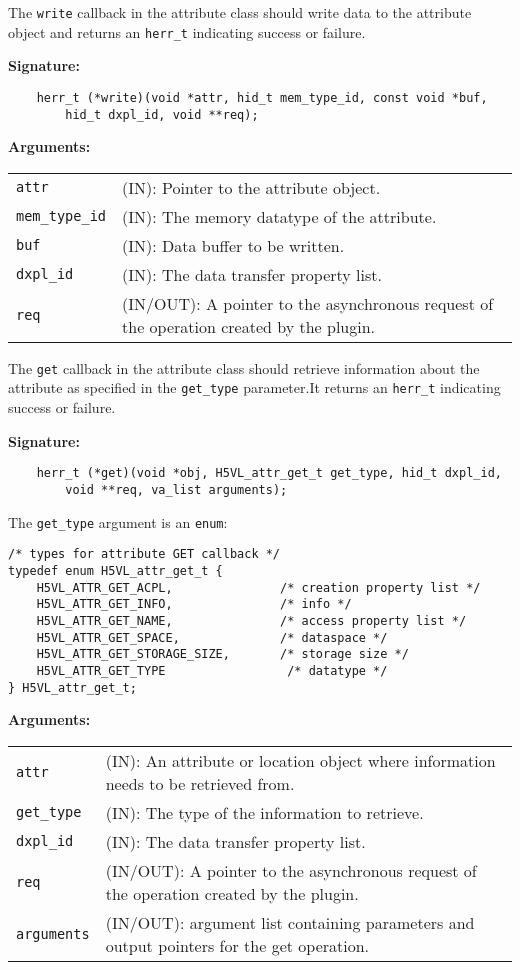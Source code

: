 The {\tt write} callback in the attribute class should write data to
the attribute object and returns an {\tt herr\_t} indicating success or
failure.

\textbf{Signature:}
\begin{lstlisting}
    herr_t (*write)(void *attr, hid_t mem_type_id, const void *buf, 
        hid_t dxpl_id, void **req);
\end{lstlisting}

\textbf{Arguments:}\\
\begin{tabular}{l p{10cm}}
  {\tt attr} & (IN): Pointer to the attribute object.\\
  {\tt mem\_type\_id} & (IN): The memory datatype of the attribute.\\
  {\tt buf} & (IN): Data buffer to be written.\\
  {\tt dxpl\_id} & (IN): The data transfer property list.\\
  {\tt req} & (IN/OUT): A pointer to the asynchronous request of the
  operation created by the plugin.\\
\end{tabular}

The {\tt get} callback in the attribute class should retrieve
information about the attribute as specified in the {\tt get\_type}
parameter.It returns an {\tt herr\_t} indicating success or failure.

\textbf{Signature:}
\begin{lstlisting}
    herr_t (*get)(void *obj, H5VL_attr_get_t get_type, hid_t dxpl_id, 
        void **req, va_list arguments);
\end{lstlisting}

The {\tt get\_type} argument is an {\tt enum}:
\begin{lstlisting}
/* types for attribute GET callback */
typedef enum H5VL_attr_get_t {
    H5VL_ATTR_GET_ACPL,               /* creation property list */
    H5VL_ATTR_GET_INFO,               /* info */
    H5VL_ATTR_GET_NAME,               /* access property list */
    H5VL_ATTR_GET_SPACE,              /* dataspace */
    H5VL_ATTR_GET_STORAGE_SIZE,       /* storage size */
    H5VL_ATTR_GET_TYPE                 /* datatype */
} H5VL_attr_get_t;
\end{lstlisting}

\textbf{Arguments:}\\
\begin{tabular}{l p{10cm}}
  {\tt attr} & (IN): An attribute or location object where information
  needs to be retrieved from.\\
  {\tt get\_type} & (IN): The type of the information to retrieve.\\
  {\tt dxpl\_id} & (IN): The data transfer property list.\\
  {\tt req} & (IN/OUT): A pointer to the asynchronous request of the
  operation created by the plugin.\\
  {\tt arguments} & (IN/OUT): argument list containing parameters and
  output pointers for the get operation. \\
\end{tabular}

